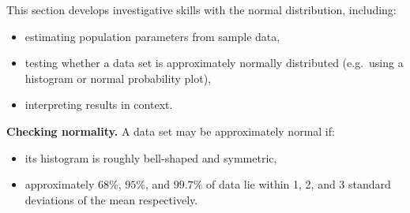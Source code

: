 
This section develops investigative skills with the normal distribution, including:

\begin{itemize}[leftmargin=*]
  \item estimating population parameters from sample data,
  \item testing whether a data set is approximately normally distributed (e.g.\ using a histogram or normal probability plot),
  \item interpreting results in context.
\end{itemize}

\textbf{Checking normality.} A data set may be approximately normal if:
\begin{itemize}[leftmargin=*]
  \item its histogram is roughly bell-shaped and symmetric,
  \item approximately $68\%$, $95\%$, and $99.7\%$ of data lie within 1, 2, and 3 standard deviations of the mean respectively.
\end{itemize}

